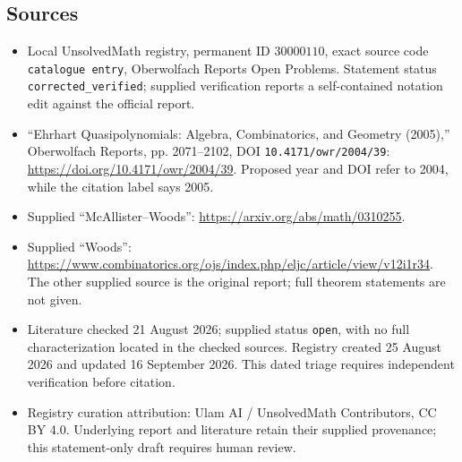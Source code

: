 \documentclass[11pt]{article}
\begin{document}
\subsection{Sources}
\begin{itemize}
\item Local UnsolvedMath registry, permanent ID \(30000110\), exact source code \texttt{catalogue entry}, Oberwolfach Reports Open Problems. Statement status \texttt{corrected\_verified}; supplied verification reports a self-contained notation edit against the official report.
\item ``Ehrhart Quasipolynomials: Algebra, Combinatorics, and Geometry (2005),'' Oberwolfach Reports, pp. 2071--2102, DOI \texttt{10.4171/owr/2004/39}: \url{https://doi.org/10.4171/owr/2004/39}. Proposed year and DOI refer to 2004, while the citation label says 2005.
\item Supplied ``McAllister--Woods'': \url{https://arxiv.org/abs/math/0310255}.
\item Supplied ``Woods'': \url{https://www.combinatorics.org/ojs/index.php/eljc/article/view/v12i1r34}. The other supplied source is the original report; full theorem statements are not given.
\item Literature checked 21 August 2026; supplied status \texttt{open}, with no full characterization located in the checked sources. Registry created 25 August 2026 and updated 16 September 2026. This dated triage requires independent verification before citation.
\item Registry curation attribution: Ulam AI / UnsolvedMath Contributors, CC BY 4.0. Underlying report and literature retain their supplied provenance; this statement-only draft requires human review.
\end{itemize}
\end{document}
